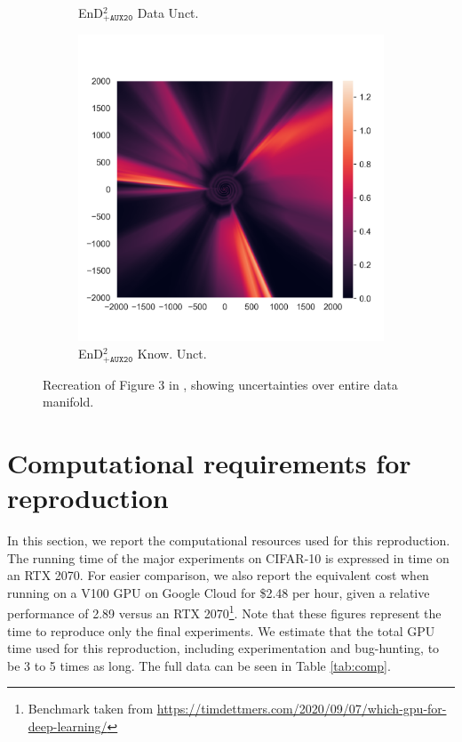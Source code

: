 \begin{figure}
\begin{subfigure}{0.22\textwidth}
  \caption{EnD$^2_{\texttt{+AUX20}}$ Data Unct.}
  \label{fig:3q}
\end{subfigure}%
\begin{subfigure}{0.22\textwidth}
  \centering
  \includegraphics[trim=42 45 15 55, clip, width=\linewidth]{../openreview/plots/3s.png}
  \caption{EnD$^2_{\texttt{+AUX20}}$ Know. Unct.}
  \label{fig:3r}
\end{subfigure}%

\caption{Recreation of Figure 3 in \cite{malinin2019ensemble}, showing uncertainties over entire data manifold.}
\label{fig:fig3}
\end{figure}





\section{Computational requirements for reproduction}

In this section, we report the computational resources used for this reproduction. The running time of the major experiments on CIFAR-10 is expressed in time on an RTX 2070. For easier comparison, we also report the equivalent cost when running on a V100 GPU on Google Cloud for \$2.48 per hour, given a relative performance of 2.89 versus an RTX 2070\footnote{Benchmark taken from \url{https://timdettmers.com/2020/09/07/which-gpu-for-deep-learning/}}. Note that these figures represent the time to reproduce only the final experiments. We estimate that the total GPU time used for this reproduction, including experimentation and bug-hunting, to be 3 to 5 times as long. The full data can be seen in Table \ref{tab:comp}. 


